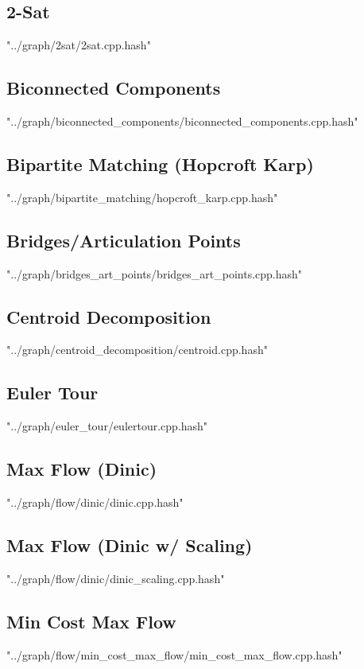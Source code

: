 \documentclass [a4paper,5pt,oneside, landscape]{article}
\begin{document}
\begin{multicols}{3}
\subsection{ 2-Sat}
 {"../graph/2sat/2sat.cpp.hash"}


\subsection{ Biconnected Components}
 {"../graph/biconnected_components/biconnected_components.cpp.hash"}


\subsection{ Bipartite Matching (Hopcroft Karp)}
 {"../graph/bipartite_matching/hopcroft_karp.cpp.hash"}


\subsection{ Bridges/Articulation Points}
 {"../graph/bridges_art_points/bridges_art_points.cpp.hash"}


\subsection{ Centroid Decomposition}
 {"../graph/centroid_decomposition/centroid.cpp.hash"}


\subsection{ Euler Tour}
 {"../graph/euler_tour/eulertour.cpp.hash"}


\subsection{ Max Flow (Dinic)}
 {"../graph/flow/dinic/dinic.cpp.hash"}


\subsection{ Max Flow (Dinic w/ Scaling)}
 {"../graph/flow/dinic/dinic_scaling.cpp.hash"}


\subsection{ Min Cost Max Flow}
 {"../graph/flow/min_cost_max_flow/min_cost_max_flow.cpp.hash"}



\end{multicols}
\end{document}
